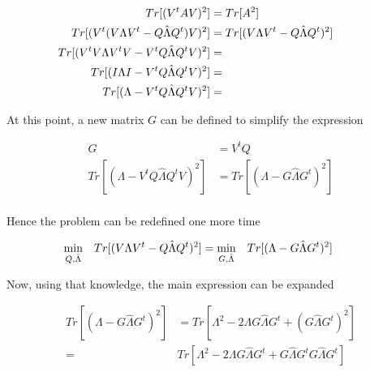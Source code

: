 \documentclass[12pt,journal]{IEEEtran}
\begin{document}
    \begin{equation*}
            \hspace{-1cm}
        \begin{aligned}
            Tr[(V^tAV)^2] &= Tr[A^2]\\
            Tr[(V^t(V\Lambda V^t - Q \hat{\Lambda} Q^t)V)^2] &= Tr[(V\Lambda V^t - Q \hat{\Lambda} Q^t)^2]\\
            Tr[(V^tV\Lambda V^tV - V^tQ \hat{\Lambda} Q^tV)^2] &=\\
            Tr[(I\Lambda I - V^tQ \hat{\Lambda} Q^tV)^2] &=\\
            Tr[(\Lambda - V^tQ \hat{\Lambda} Q^tV)^2] &=\\
        \end{aligned}
    \end{equation*}

    At this point, a new matrix $G$ can be defined to simplify the expression

    \begin{equation*}
        \begin{aligned}
            G &= V^tQ\\
            Tr[(\Lambda - V^tQ \hat{\Lambda} Q^tV)^2] &= Tr[(\Lambda - G \hat{\Lambda} G^t)^2]\\
        \end{aligned}
    \end{equation*}

    Hence the problem can be redefined one more time

    \begin{equation*}
        \hspace{-0.5cm}
        \begin{aligned}
        \underset{Q,\hat{\Lambda}}{\text{min}} \quad Tr[(V\Lambda V^t - Q \hat{\Lambda} Q^t)^2]
        &=
        \underset{G,\hat{\Lambda}}{\text{min}} \quad Tr[(\Lambda - G \hat{\Lambda} G^t)^2]
        \end{aligned}
    \end{equation*}

    Now, using that knowledge, the main expression can be expanded

    \begin{equation*}
        \begin{aligned}
        Tr[(\Lambda - G \hat{\Lambda} G^t)^2]
        &=
        Tr[\Lambda^2 - 2 \Lambda G \hat{\Lambda} G^t + (G \hat{\Lambda} G^t)^2]\\
        =
        &Tr[\Lambda^2 - 2 \Lambda G \hat{\Lambda} G^t + G \hat{\Lambda} G^t G \hat{\Lambda} G^t]\\
        \end{aligned}
    \end{equation*}
\end{document}
